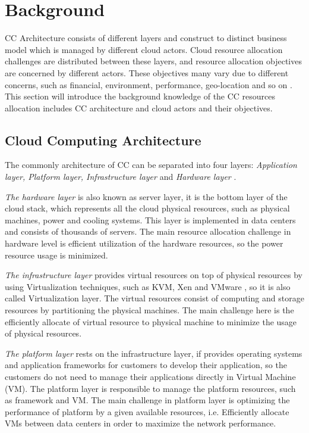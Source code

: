 \documentclass[onecolumn,10pt]{asme2ej}
\begin{document}
\section{Background}
CC Architecture consists of different layers and construct to distinct business model which is managed by different cloud actors. Cloud resource allocation challenges are distributed between these layers, and resource allocation objectives are concerned by different actors. These objectives many vary due to different concerns, such as financial, environment, performance, geo-location and so on \cite{zhang2010cloud}. This section will introduce the background knowledge of the CC resources allocation includes CC architecture and cloud actors and their objectives.


\subsection{Cloud Computing Architecture}
The commonly architecture of CC can be separated into four layers: \emph{Application layer, Platform layer, Infrastructure layer} and \emph{Hardware layer} \cite{jadeja2012cloud}. 

\emph{The hardware layer} is also known as server layer, it is the bottom layer of the cloud stack, which represents all the cloud physical resources, such as physical machines, power and cooling systems. This layer is implemented in data centers and consists of thousands of servers. The main resource allocation challenge in hardware level is efficient utilization of the hardware resources, so the power resource usage is minimized. 

\emph{The infrastructure layer} provides virtual resources on top of physical resources by using Virtualization techniques, such as KVM, Xen and VMware \cite{rodriguez2012summary}, so it is also called Virtualization layer. The virtual resources consist of computing and storage resources by partitioning the physical machines. The main challenge here is the efficiently allocate of virtual resource to physical machine to minimize the usage of physical resources.

\emph{The platform layer} rests on the infrastructure layer, if provides operating systems and application frameworks for customers to develop their application, so the customers do not need to manage their applications directly in Virtual Machine (VM). The platform layer is responsible to manage the platform resources, such as framework and VM. The main challenge in platform layer is optimizing the performance of platform by a given available resources, i.e. Efficiently allocate VMs between data centers in order to maximize the network performance.
\end{document}
